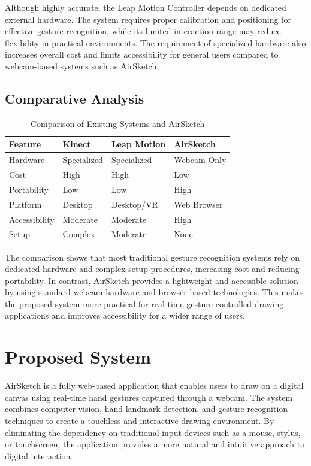\documentclass[conference]{IEEEtran}
\begin{document}
Although highly accurate, the Leap Motion Controller depends on dedicated external hardware. The system requires proper calibration and positioning for effective gesture recognition, while its limited interaction range may reduce flexibility in practical environments. The requirement of specialized hardware also increases overall cost and limits accessibility for general users compared to webcam-based systems such as AirSketch.

\subsection{Comparative Analysis}

\begin{table}[h]
\caption{Comparison of Existing Systems and AirSketch}
\centering
\renewcommand{\arraystretch}{1.3}
\begin{tabular}{|p{1.8cm}|p{1.5cm}|p{1.7cm}|p{1.7cm}|}
\hline
\textbf{Feature} & \textbf{Kinect} & \textbf{Leap Motion} & \textbf{AirSketch} \\
\hline
Hardware & Specialized & Specialized & Webcam Only \\
\hline
Cost & High & High & Low \\
\hline
Portability & Low & Low & High \\
\hline
Platform & Desktop & Desktop/VR & Web Browser \\
\hline
Accessibility & Moderate & Moderate & High \\
\hline
Setup & Complex & Moderate & None \\
\hline
\end{tabular}
\end{table}

The comparison shows that most traditional gesture recognition systems rely on dedicated hardware and complex setup procedures, increasing cost and reducing portability. In contrast, AirSketch provides a lightweight and accessible solution by using standard webcam hardware and browser-based technologies. This makes the proposed system more practical for real-time gesture-controlled drawing applications and improves accessibility for a wider range of users.

\section{Proposed System}

AirSketch is a fully web-based application that enables users to draw on a digital canvas using real-time hand gestures captured through a webcam. The system combines computer vision, hand landmark detection, and gesture recognition techniques to create a touchless and interactive drawing environment. By eliminating the dependency on traditional input devices such as a mouse, stylus, or touchscreen, the application provides a more natural and intuitive approach to digital interaction.
\end{document}
